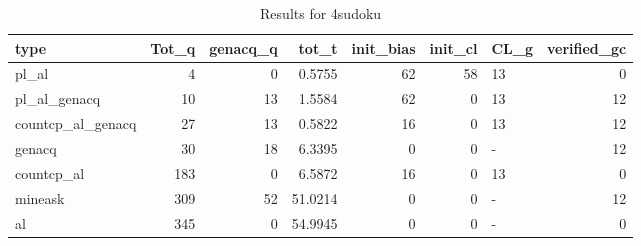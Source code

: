 \begin{table}[ht]
\caption{Results for 4sudoku}
\begin{tabular}{lrrrrrlr}
\hline
 type              &   Tot\_q &   genacq\_q &   tot\_t &   init\_bias &   init\_cl & CL\_g   &   verified\_gc \\
\hline
 pl\_al             &       4 &          0 &  0.5755 &          62 &        58 & 13     &             0 \\
 pl\_al\_genacq      &      10 &         13 &  1.5584 &          62 &         0 & 13     &            12 \\
 countcp\_al\_genacq &      27 &         13 &  0.5822 &          16 &         0 & 13     &            12 \\
 genacq            &      30 &         18 &  6.3395 &           0 &         0 & -      &            12 \\
 countcp\_al        &     183 &          0 &  6.5872 &          16 &         0 & 13     &             0 \\
 mineask           &     309 &         52 & 51.0214 &           0 &         0 & -      &            12 \\
 al                &     345 &          0 & 54.9945 &           0 &         0 & -      &             0 \\
\hline
\end{tabular}
\end{table}